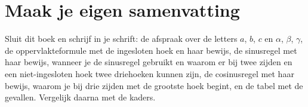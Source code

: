 \ifzelfstudie
\section*{Maak je eigen samenvatting}
Sluit dit boek en schrijf in je schrift: de afspraak over de letters $a$, $b$, $c$ en $\alpha$, $\beta$, $\gamma$, de oppervlakteformule met de ingesloten hoek en haar bewijs, de sinusregel met haar bewijs, wanneer je de sinusregel gebruikt en waarom er bij twee zijden en een niet-ingesloten hoek twee driehoeken kunnen zijn, de cosinusregel met haar bewijs, waarom je bij drie zijden met de grootste hoek begint, en de tabel met de gevallen. Vergelijk daarna met de kaders.
\fi
